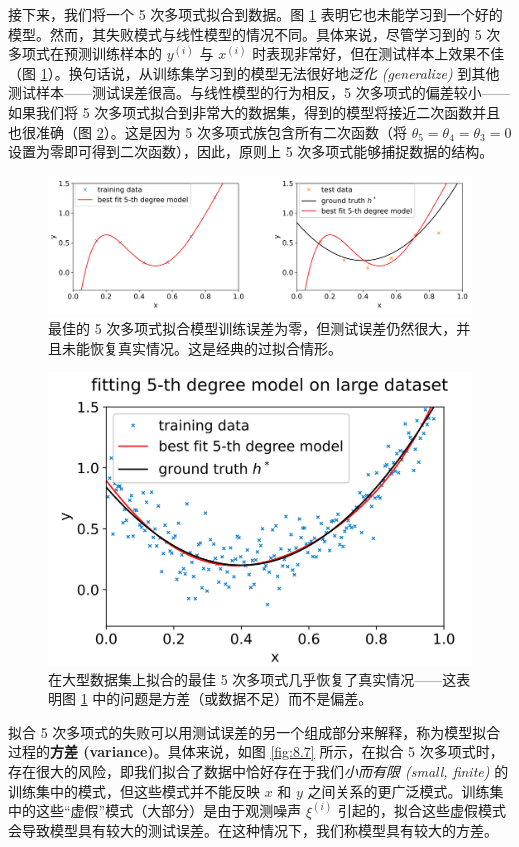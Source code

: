接下来，我们将一个 5 次多项式拟合到数据。图 \ref{fig:8.5} 表明它也未能学习到一个好的模型。然而，其失败模式与线性模型的情况不同。具体来说，尽管学习到的 5 次多项式在预测训练样本的 $y^{(i)}$ 与 $x^{(i)}$ 时表现非常好，但在测试样本上效果不佳（图 \ref{fig:8.5}）。换句话说，从训练集学习到的模型无法很好地\textit{泛化 (generalize)} 到其他测试样本——测试误差很高。与线性模型的行为相反，5 次多项式的偏差较小——如果我们将 5 次多项式拟合到非常大的数据集，得到的模型将接近二次函数并且也很准确（图 \ref{fig:8.6}）。这是因为 5 次多项式族包含所有二次函数（将 $\theta_5 = \theta_4 = \theta_3 = 0$ 设置为零即可得到二次函数），因此，原则上 5 次多项式能够捕捉数据的结构。

\begin{figure}[H]
    \centering
    \includegraphics[width=0.8\linewidth]{figs/fitting_5th.png}
    \caption{最佳的 5 次多项式拟合模型训练误差为零，但测试误差仍然很大，并且未能恢复真实情况。这是经典的过拟合情形。}
    \label{fig:8.5}
\end{figure}

\begin{figure}[H]
    \centering
    \includegraphics[width=0.5\linewidth]{figs/fitting_5th_large.png}
    \caption{在大型数据集上拟合的最佳 5 次多项式几乎恢复了真实情况——这表明图 \ref{fig:8.5} 中的问题是方差（或数据不足）而不是偏差。}
    \label{fig:8.6}
\end{figure}

拟合 5 次多项式的失败可以用测试误差的另一个组成部分来解释，称为模型拟合过程的\textbf{方差 (variance)}。具体来说，如图 \ref{fig:8.7} 所示，在拟合 5 次多项式时，存在很大的风险，即我们拟合了数据中恰好存在于我们\textit{小而有限 (small, finite)} 的训练集中的模式，但这些模式并不能反映 $x$ 和 $y$ 之间关系的更广泛模式。训练集中的这些“虚假”模式（大部分）是由于观测噪声 $\xi^{(i)}$ 引起的，拟合这些虚假模式会导致模型具有较大的测试误差。在这种情况下，我们称模型具有较大的方差。

